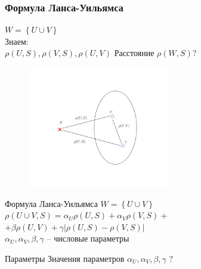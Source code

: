 \documentclass[10pt]{beamer}
\begin{document}
\begin{frame}\frametitle{Формула Ланса-Уильямса}
	\begin{minipage}[t]{0.45\linewidth}
    \vspace{15mm}
 		${ W = \left\{ U \cup V \right\} }$\\	
		\bigbreak		
		\alert{Знаем}:\\
		${\rho(U, S), \rho(V, S), \rho(U, V)}$
		\bigbreak				
		Расстояние $\rho(W, S)$?\\	
	\end{minipage}%
	\begin{minipage}[t]{0.55\linewidth}
	  \begin{figure}[htbp]
	    \includegraphics[height=150pt, keepaspectratio = true]{images/lans-formula}  
	  \end{figure}
  \end{minipage}%
\end{frame}

\begin{frame}{Формула Ланса-Уильямса}
	${ W = \left\{ U \cup V \right\} }$\\
	\bigbreak
	${\rho(U \cup V, S) = \alpha_U \rho(U, S) + \alpha_V \rho(V, S) + }$ \\
	\hspace{30mm} ${ + \beta \rho(U, V) + \gamma \vert \rho(U, S) - \rho(V, S)\vert}$\\
	\bigbreak
	${\alpha_U, \alpha_V, \beta, \gamma}$ -- числовые параметры
\end{frame}

\begin{frame}{Параметры}
	Значения параметров
	${\alpha_U, \alpha_V, \beta, \gamma}$ ?
\end{frame}
\end{document}
